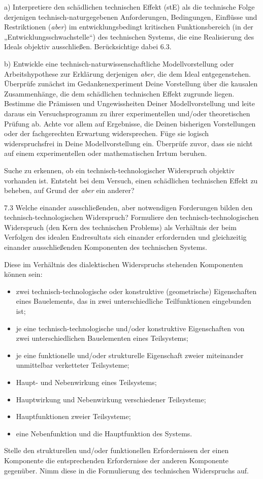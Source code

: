 \documentclass[12pt,a4paper]{article}
\begin{document}
a) Interpretiere den schädlichen technischen Effekt (stE) als die technische
Folge derjenigen technisch-naturgegebenen Anforderungen, Bedingungen, Einflüsse
und Restriktionen (\emph{aber}) im entwicklungsbedingt kritischen
Funktionsbereich (in der „Entwicklungsschwachstelle“) des technischen Systems,
die eine Realisierung des Ideals objektiv ausschließen. Berücksichtige dabei
6.3.

b) Entwickle eine technisch-naturwissenschaftliche Modellvorstellung oder
Arbeitshypothese zur Erklärung derjenigen \emph{aber}, die dem Ideal
entgegenstehen. Überprüfe zunächst im Gedankenexperiment Deine Vorstellung über
die kausalen Zusammenhänge, die dem schädlichen technischen Effekt zugrunde
liegen. Bestimme die Prämissen und Ungewissheiten Deiner Modellvorstellung und
leite daraus ein Versuchsprogramm zu ihrer experimentellen und/oder
theoretischen Prüfung ab. Achte vor allem auf Ergebnisse, die Deinen bisherigen
Vorstellungen oder der fachgerechten Erwartung widersprechen. Füge sie logisch
widerspruchsfrei in Deine Modellvorstellung ein. Überprüfe zuvor, dass sie
nicht auf einem experimentellen oder mathematischen Irrtum beruhen.

Suche zu erkennen, ob ein technisch-technologischer Widerspruch objektiv
vorhanden ist. Entsteht bei dem Versuch, einen schädlichen technischen Effekt
zu beheben, auf Grund der \emph{aber} ein anderer?

7.3 Welche einander ausschließenden, aber notwendigen Forderungen bilden den
technisch-technologischen Widerspruch? Formuliere den technisch-technologischen
Widerspruch (den Kern des technischen Problems) als Verhältnis der beim
Verfolgen des idealen Endresultats sich einander erfordernden und gleichzeitig
einander ausschließenden Komponenten des technischen Systems.

Diese im Verhältnis des dialektischen Widerspruchs stehenden Komponenten können
sein:
\begin{itemize}
  \item zwei technisch-technologische oder konstruktive (geometrische)
    Eigenschaften eines Bauelements, das in zwei unterschiedliche
    Teilfunktionen eingebunden ist;
  \item je eine technisch-technologische und/oder konstruktive Eigenschaften
    von zwei unterschiedlichen Bauelementen eines Teilsystems;
  \item je eine funktionelle und/oder strukturelle Eigenschaft zweier
    miteinander unmittelbar verketteter Teilsysteme;
  \item Haupt- und Nebenwirkung eines Teilsystems;
  \item Hauptwirkung und Nebenwirkung verschiedener Teilsysteme;
  \item Hauptfunktionen zweier Teilsysteme;
  \item eine Nebenfunktion und die Hauptfunktion des Systems.
\end{itemize}
Stelle den strukturellen und/oder funktionellen Erfordernissen der einen
Komponente die entsprechenden Erfordernisse der anderen Komponente gegenüber.
Nimm diese in die Formulierung des technischen Widerspruchs auf.
\end{document}
